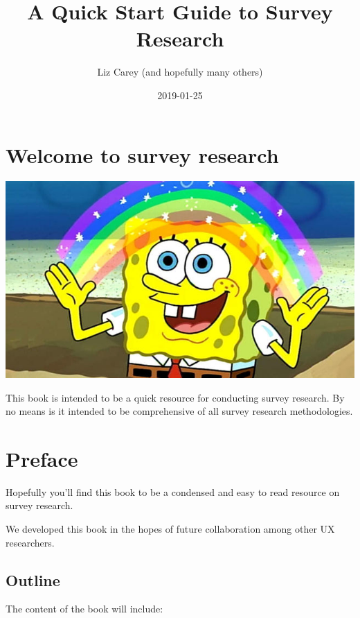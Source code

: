 \documentclass[]{book}
\title{A Quick Start Guide to Survey Research}
\author{Liz Carey (and hopefully many others)}
\date{2019-01-25}
\begin{document}
\maketitle

{
\hypersetup{linkcolor=black}
\setcounter{tocdepth}{1}
\tableofcontents
}
\hypertarget{welcome-to-survey-research}{%
\chapter*{Welcome to survey research}\label{welcome-to-survey-research}}

\includegraphics{figs/sponge_bob.png}

This book is intended to be a quick resource for conducting survey research. By no means is it intended to be comprehensive of all survey research methodologies.

\hypertarget{preface}{%
\chapter*{Preface}\label{preface}}

Hopefully you'll find this book to be a condensed and easy to read resource on survey research.

We developed this book in the hopes of future collaboration among other UX researchers.

\hypertarget{outline}{%
\section*{Outline}\label{outline}}

The content of the book will include:
\end{document}
